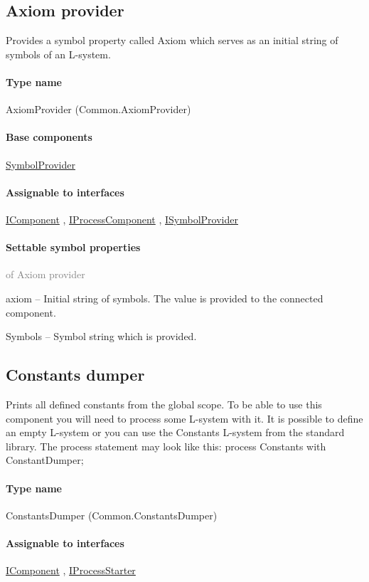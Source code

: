 \subsection{Axiom provider}
\label{Malsys.Processing.Components.Common.AxiomProvider}
Provides a symbol property called Axiom which serves as an initial string of symbols of an L-system.\paragraph{Type name}
AxiomProvider (Common.AxiomProvider) 	\paragraph{Base components}
		\hyperref[Malsys.Processing.Components.Common.SymbolProvider]{SymbolProvider}%
	\paragraph{Assignable to interfaces}
		\hyperref[Malsys.Processing.Components.IComponent]{IComponent}%
, 		\hyperref[Malsys.Processing.Components.IProcessComponent]{IProcessComponent}%
, 		\hyperref[Malsys.Processing.Components.ISymbolProvider]{ISymbolProvider}%
	\paragraph{Settable symbol properties}\textcolor{gray}{of Axiom provider}
	\begin{description*}
		\item[axiom]
			-- Initial string of symbols.
            The value is provided to the connected component.
		\item[Symbols]
			-- Symbol string which is provided.
	\end{description*}
	


\subsection{Constants dumper}
\label{Malsys.Processing.Components.Common.ConstantsDumper}
Prints all defined constants from the global scope.
            To be able to use this component you will need to process some L-system with it.
            It is possible to define an empty L-system or you can use the Constants L-system from the standard library.
            The process statement may look like this: process Constants with ConstantDumper;\paragraph{Type name}
ConstantsDumper (Common.ConstantsDumper) 	\paragraph{Assignable to interfaces}
		\hyperref[Malsys.Processing.Components.IComponent]{IComponent}%
, 		\hyperref[Malsys.Processing.Components.IProcessStarter]{IProcessStarter}%
